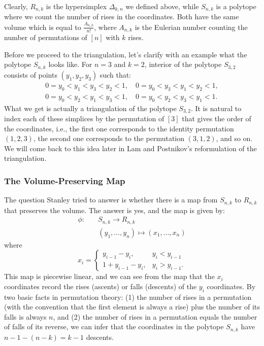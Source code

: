 \documentclass[12pt]{article}
\theoremstyle{definition}
\numberwithin{equation}{subsection}
\begin{document}
Clearly, $R_{n,k}$ is the hypersimplex $\Delta_{k,n}$ we defined above, while $S_{n,k}$ is a polytope where we count the number of rises in the coordinates. Both have the same volume which is equal to $\frac{A_{n,k}}{n!}$, where $A_{n,k}$ is the Eulerian number counting the number of permutations of $[n]$ with $k$ rises.

Before we proceed to the triangulation, let's clarify with an example what the polytope $S_{n,k}$ looks like. For $n=3$ and $k=2$, interior of the polytope $S_{3,2}$ consists of points $(y_1, y_2, y_3)$ such that:
\[
\begin{array}{l}
0 = y_0 < y_1 < y_3 < y_2 < 1,\quad 0 = y_0 < y_3 < y_1 < y_2 < 1, \\
0 = y_0 < y_2 < y_1 < y_3 < 1,\quad 0 = y_0 < y_2 < y_3 < y_1 < 1.
\end{array}
\]
What we get is actually a triangulation of the polytope $S_{3,2}$. It is natural to index each of these simplices by the permutation of $[3]$ that gives the order of the coordinates, i.e., the first one corresponds to the identity permutation $(1,2,3)$, the second one corresponds to the permutation $(3,1,2)$, and so on. We will come back to this idea later in Lam and Postnikov's reformulation of the triangulation.


\subsubsection{The Volume-Preserving Map}
The question Stanley tried to answer is whether there is a map from $S_{n,k}$ to $R_{n,k}$ that preserves the volume. The answer is yes, and the map is given by:
\[
\begin{aligned}
    \phi: \quad & S_{n,k} \longrightarrow R_{n,k} \\
    & (y_1, \ldots, y_n) \longmapsto (x_1, \ldots, x_n)
\end{aligned}
\]
where
\[
x_i =
\begin{cases}
y_{i-1} - y_i, & y_i < y_{i-1} \\
1 + y_{i-1} - y_i, & y_i > y_{i-1}.
\end{cases}
\]
This map is piecewise linear, and we can see from the map that the $x_i$ coordinates record the rises (ascents) or falls (descents) of the $y_i$ coordinates. By two basic facts in permutation theory: (1) the number of rises in a permutation (with the convention that the first element is always a rise) plus the number of its falls is always $n$, and (2) the number of rises in a permutation equals the number of falls of its reverse, we can infer that the coordinates in the polytope $S_{n,k}$ have $n - 1 - (n - k) = k-1$ descents.
\end{document}
